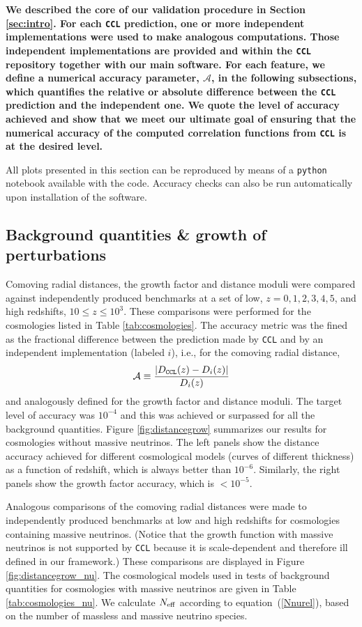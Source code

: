 \documentclass[\docopts]{\docclass}
\newcommand{\ccl}{{\tt CCL}\xspace}
\begin{document}


{\bf We described the core of our validation procedure in Section \ref{sec:intro}. For each \ccl prediction, one or more independent implementations were used to make analogous computations. Those independent implementations are provided and within the \ccl repository together with our main software. For each feature, we define a numerical accuracy parameter, $\mathcal{A}$, in the following subsections, which quantifies the relative or absolute difference between the \ccl prediction and the independent one. We quote the level of accuracy achieved and show that we meet our ultimate goal of ensuring that the numerical accuracy of the computed correlation functions from \ccl is at the desired level.}

All plots presented in this section can be reproduced by means of a {\tt python} notebook available with the code. Accuracy checks can also be run automatically upon installation of the software.

\subsection{Background quantities \& growth of perturbations}

Comoving radial distances, the growth factor and distance moduli were compared against independently produced benchmarks at a set of low, $z = 0,1,2,3,4,5$, and high redshifts, $10\leq z \leq 10^3$. These comparisons were performed for the cosmologies listed in Table \ref{tab:cosmologies}. The accuracy metric was the fined as the fractional difference between the prediction made by \ccl and by an independent implementation (labeled $i$), i.e., for the comoving radial distance,
\begin{equation}
  \mathcal{A} \equiv \frac{|D_{\tt CCL}(z)-D_{i}(z)|}{D_i(z)}
\end{equation}
and analogously defined for the growth factor and distance moduli.
The target level of accuracy was $10^{-4}$ and this was achieved or surpassed for all the background quantities. Figure \ref{fig:distancegrow} summarizes our results for cosmologies without massive neutrinos. The left panels show the distance accuracy achieved for different cosmological models (curves of different thickness) as a function of redshift, which is always better than $10^{-6}$. Similarly, the right panels show the growth factor accuracy, which is $<10^{-5}$. 

Analogous comparisons of the comoving radial distances were made to independently produced benchmarks at low and high redshifts for cosmologies containing massive neutrinos. (Notice that the growth function with massive neutrinos is not supported by \ccl because it is scale-dependent and therefore ill defined in our framework.) These comparisons are displayed in Figure \ref{fig:distancegrow_nu}. The cosmological models used in tests of background quantities for cosmologies with massive neutrinos are given in Table \ref{tab:cosmologies_nu}. We calculate $N_{\rm eff}$ according to equation~(\ref{Nnurel}), based on the number of massless and massive neutrino species.
\end{document}
